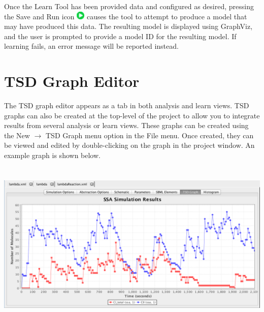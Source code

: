 \documentclass[titlepage,11pt]{article}
\begin{document}
Once the Learn Tool has been provided data and configured as desired, pressing the Save and Run icon \includegraphics{../gui/icons/run-icon} causes the tool to attempt to produce a model that may have produced this data.  The resulting model is displayed using GraphViz, and the user is prompted to provide a model ID for the resulting model.  If learning fails, an error message will be reported instead.

\clearpage

\section{\label{TSDGraph}TSD Graph Editor}

\noindent
The TSD graph editor appears as a tab in both analysis and learn views.  TSD graphs can also be created at the top-level of the project to allow you to integrate results from several analysis or learn views. These graphs can be created using the New $\rightarrow$ TSD Graph menu option in the File menu. Once created, they can be viewed and edited by double-clicking on the graph in the project window.  An example graph is shown below.

\begin{center}
\includegraphics[height=80mm]{screenshots/ssaSimResults}
\end{center}
\end{document}
